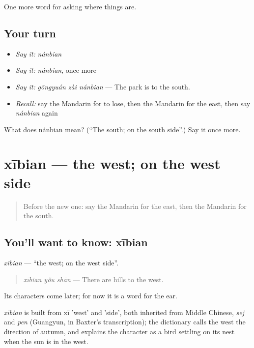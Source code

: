 \begin{grammarlens}[title={What you've built}]
One more word for asking where things are.
\end{grammarlens}

\subsection*{Your turn}
\begin{itemize}
\raggedright
  \item \emph{Say it:} \emph{nánbian}
  \item \emph{Say it:} \emph{nánbian}, once more
  \item \emph{Say it:} \emph{gōngyuán zài nánbian} — The park is to the south.
  \item \emph{Recall:} say the Mandarin for to lose, then the Mandarin for the east, then say \emph{nánbian} again
\end{itemize}

\begin{tcolorbox}[breakable,colback=teal!4,colframe=teal!35!black,title={Before you move on}]
What does nánbian mean? (\textquotedblleft{}The south; on the south side\textquotedblright{}.) Say it once more.
\end{tcolorbox}
\section[xībian]{xībian — the west; on the west side}

\label{lesson:ZH-C117-xibian}



\begin{quote}
Before the new one: say the Mandarin for the east, then the Mandarin for the south.
\end{quote}

\subsection*{You'll want to know: xībian}
\emph{xībian} — \textquotedblleft{}the west; on the west side\textquotedblright{}.

\begin{quote}
\emph{xībian yǒu shān} — There are hills to the west.
\end{quote}

Its characters come later; for now it is a word for the ear.

\begin{cousinweb}
\emph{xībian} is built from xī 'west' and  'side', both inherited from Middle Chinese, \emph{sej} and \emph{pen} (Guangyun, in Baxter's transcription); the dictionary calls the west the direction of autumn, and explains the character as a bird settling on its nest when the sun is in the west.
\end{cousinweb}

